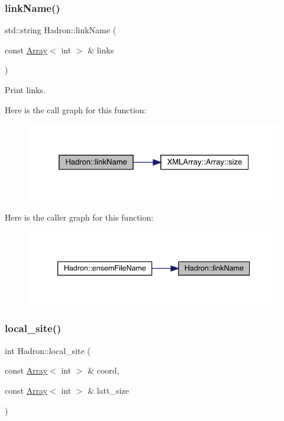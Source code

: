 \subsubsection{\texorpdfstring{linkName()}{linkName()}}
{\footnotesize\ttfamily std\+::string Hadron\+::link\+Name (\begin{DoxyParamCaption}\item[{const \mbox{\hyperlink{classXMLArray_1_1Array}{Array}}$<$ int $>$ \&}]{links }\end{DoxyParamCaption})}



Print links. 

Here is the call graph for this function\+:
\nopagebreak
\begin{figure}[H]
\begin{center}
\leavevmode
\includegraphics[width=325pt]{d1/daf/namespaceHadron_afbb540812e62aedb8826e62c56efcff8_cgraph}
\end{center}
\end{figure}
Here is the caller graph for this function\+:
\nopagebreak
\begin{figure}[H]
\begin{center}
\leavevmode
\includegraphics[width=339pt]{d1/daf/namespaceHadron_afbb540812e62aedb8826e62c56efcff8_icgraph}
\end{center}
\end{figure}
\mbox{\label{namespaceHadron_ab96485b602362d63c3326d4326e3733d}} 
\subsubsection{\texorpdfstring{local\_site()}{local\_site()}}
{\footnotesize\ttfamily int Hadron\+::local\+\_\+site (\begin{DoxyParamCaption}\item[{const \mbox{\hyperlink{classXMLArray_1_1Array}{Array}}$<$ int $>$ \&}]{coord,  }\item[{const \mbox{\hyperlink{classXMLArray_1_1Array}{Array}}$<$ int $>$ \&}]{latt\+\_\+size }\end{DoxyParamCaption})}



